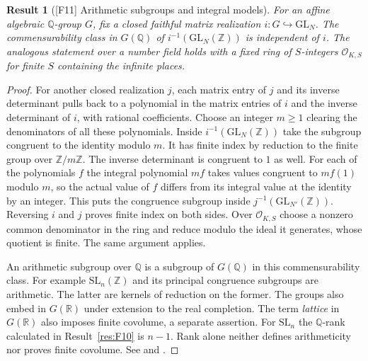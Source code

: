 \documentclass[11pt,a4paper,openany,oneside]{book}
\theoremstyle{resultstyle}
\newtheorem{statement}{Result}[chapter]
\newenvironment{result}[2]{\clubpenalty=10000\begin{statement}[\textnormal{[#1]} #2]\leavevmode\label{res:#1}\ignorespaces}{\end{statement}}
\theoremstyle{definition}
\numberwithin{equation}{chapter}
\newcommand{\GL}{\mathrm{GL}}
\newcommand{\SL}{\mathrm{SL}}
\newcommand{\OO}{\mathcal{O}}
\newcommand{\ZZ}{\mathbb{Z}}
\newcommand{\RR}{\mathbb{R}}
\newcommand{\QQ}{\mathbb{Q}}
\begin{document}
\begin{result}{F11}{Arithmetic subgroups and integral models}
For an affine algebraic $\QQ$-group $G$, fix a closed faithful matrix realization $i\colon G\hookrightarrow\GL_N$. The commensurability class in $G(\QQ)$ of $i^{-1}(\GL_N(\ZZ))$ is independent of $i$. The analogous statement over a number field holds with a fixed ring of $S$-integers $\OO_{K,S}$ for finite $S$ containing the infinite places.
\end{result}
\begin{proof}
For another closed realization $j$, each matrix entry of $j$ and its inverse determinant pulls back to a polynomial in the matrix entries of $i$ and the inverse determinant of $i$, with rational coefficients. Choose an integer $m\geq 1$ clearing the denominators of all these polynomials. Inside $i^{-1}(\GL_N(\ZZ))$ take the subgroup congruent to the identity modulo $m$. It has finite index by reduction to the finite group over $\ZZ/m\ZZ$. The inverse determinant is congruent to $1$ as well. For each of the polynomials $f$ the integral polynomial $mf$ takes values congruent to $mf(1)$ modulo $m$, so the actual value of $f$ differs from its integral value at the identity by an integer. This puts the congruence subgroup inside $j^{-1}(\GL_{N'}(\ZZ))$. Reversing $i$ and $j$ proves finite index on both sides. Over $\OO_{K,S}$ choose a nonzero common denominator in the ring and reduce modulo the ideal it generates, whose quotient is finite. The same argument applies.

An arithmetic subgroup over $\QQ$ is a subgroup of $G(\QQ)$ in this commensurability class. For example $\SL_n(\ZZ)$ and its principal congruence subgroups are arithmetic. The latter are kernels of reduction on the former. The groups also embed in $G(\RR)$ under extension to the real completion. The term \emph{lattice} in $G(\RR)$ also imposes finite covolume, a separate assertion. For $\SL_n$ the $\QQ$-rank calculated in Result~\ref{res:F10} is $n-1$. Rank alone neither defines arithmeticity nor proves finite covolume. See \cite[Secs.~5.1 and 9.1]{morris} and \cite[Ch.~4]{prr}.
\end{proof}
\end{document}
